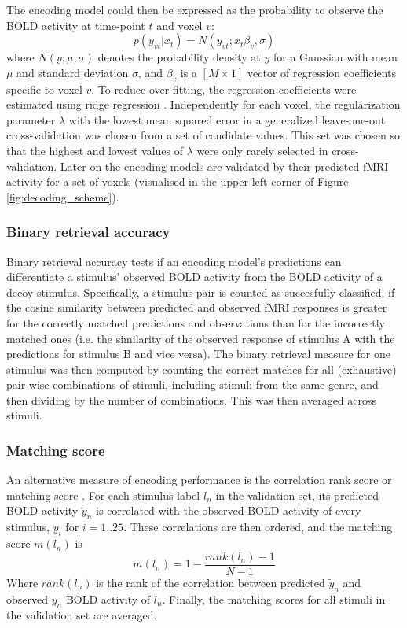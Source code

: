 The encoding model could then be expressed as the probability to observe the
BOLD activity at time-point $t$ and voxel $v$:
\begin{equation}
  \label{eq:encmo}
  p(y_{vt}|x_{t}) = N(y_{vt};x_{t}\beta_{v},\sigma)
\end{equation}
where $N(y;\mu,\sigma)$ denotes the probability density at $y$ for a
Gaussian with mean $\mu$ and standard deviation $\sigma$, and $\beta_{v}$ is a
$[M\times1]$ vector of regression coefficients specific to voxel $v$. To reduce
over-fitting, the regression-coefficients were estimated using ridge regression
\citep{HK70}.  Independently for each voxel, the regularization parameter
$\lambda$ with the lowest mean squared error in a generalized leave-one-out
cross-validation \citep{GHW79} was chosen from a set of candidate values.
This set was chosen so that the highest and lowest values of $\lambda$ were only
rarely selected in cross-validation.
Later on the encoding models are validated by their predicted f{MRI} activity
for a set of voxels (visualised in the upper left corner of Figure
\ref{fig:decoding_scheme}). 


%
%
\subsubsection*{Binary retrieval accuracy}
%
Binary retrieval accuracy \citep{ML08} tests if an encoding model's predictions
can differentiate a stimulus' observed BOLD activity from the BOLD activity of
a decoy stimulus.  Specifically, a stimulus pair is counted as succesfully
classified, if the cosine similarity between predicted and observed f{MRI}
responses is greater for the correctly matched predictions and observations
than for the incorrectly matched ones (i.e. the similarity of the observed
response of stimulus A with the predictions for stimulus B and vice versa).
The binary retrieval measure for one stimulus was then computed by counting the
correct matches for all (exhaustive) pair-wise combinations of stimuli, including
stimuli from the same genre, and then dividing by the number of combinations.
This was then averaged across stimuli.


\subsubsection*{Matching score}
%
An alternative measure of encoding performance is the correlation rank score or
matching score \citep{SF14}. For each stimulus label $l_{n}$ in the validation
set, its predicted BOLD activity $\widetilde{y}_{n}$ is correlated with the
observed BOLD activity of every stimulus, $y_{i}$ for $i=1..25$. These
correlations are then ordered, and the  matching score $m(l_{n})$ is \[
m(l_{n}) = 1-\frac{rank(l_{n})-1}{N-1} \] Where $rank(l_{n})$ is the rank of
the correlation between predicted $\widetilde{y}_{n}$ and observed $y_{n}$ BOLD
activity of $l_{n}$. Finally, the matching scores for all stimuli in the
validation set are averaged.

